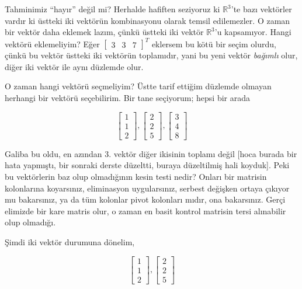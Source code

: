 \documentclass[12pt,fleqn]{article}\usepackage{../../common}
\begin{document}
Tahminimiz ``hayır'' değil mi? Herhalde hafiften seziyoruz ki
$\mathbb{R}^3$'te bazı vektörler vardır ki üstteki iki vektörün kombinasyonu
olarak temsil edilemezler. O zaman bir vektör daha eklemek lazım, çünkü
üstteki iki vektör $\mathbb{R}^3$'u kapsamıyor. Hangi vektörü eklemeliyim?
Eğer $\left[\begin{array}{rrr}3&3&7\end{array}\right]^T$ eklersem bu kötü
bir seçim olurdu, çünkü bu vektör üstteki iki vektörün toplamıdır, yani bu
yeni vektör {\em bağımlı} olur, diğer iki vektör ile aynı düzlemde olur. 

O zaman hangi vektörü seçmeliyim? Üstte tarif ettiğim düzlemde olmayan
herhangi bir vektörü seçebilirim. Bir tane seçiyorum; hepsi bir arada

$$ 
\left[\begin{array}{r}
1 \\ 1 \\ 2 
\end{array}\right],
\left[\begin{array}{r}
2 \\ 2 \\ 5 
\end{array}\right],
\left[\begin{array}{r}
3 \\ 4 \\ 8
\end{array}\right]
 $$

Galiba bu oldu, en azından 3. vektör diğer ikisinin toplamı değil [hoca
burada bir hata yapmıştı, bir sonraki derste düzeltti, buraya düzeltilmiş
hali koyduk]. Peki bu vektörlerin baz olup olmadığının kesin testi nedir?
Onları bir matrisin kolonlarına koyarsınız, eliminasyon uygularsınız,
serbest değişken ortaya çıkıyor mu bakarsınız, ya da tüm kolonlar pivot
kolonları mıdır, ona bakarsınız. Gerçi elimizde bir kare matris olur, o
zaman en basit kontrol matrisin tersi alınabilir olup olmadığı.

Şimdi iki vektör durumuna dönelim,

$$ 
\left[\begin{array}{r}
1 \\ 1 \\ 2 
\end{array}\right],
\left[\begin{array}{r}
2 \\ 2 \\ 5 
\end{array}\right]
 $$
\end{document}
